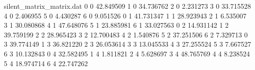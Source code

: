 
\begin{filecontents*}[overwrite]{silent_matrix_matrix.dat}
0 0 42.849509
1 0 34.736762
2 0 2.231273
3 0 33.715528
4 0 2.406955
5 0 4.430287
6 0 9.051526
0 1 41.731347
1 1 28.923943
2 1 6.535007
3 1 30.080868
4 1 47.648076
5 1 23.885981
6 1 33.027563
0 2 14.931142
1 2 39.759199
2 2 28.965423
3 2 12.700483
4 2 1.540876
5 2 37.251506
6 2 7.329713
0 3 39.774149
1 3 36.821220
2 3 26.053614
3 3 13.045533
4 3 27.255524
5 3 7.667527
6 3 10.132843
0 4 32.582495
1 4 1.811821
2 4 5.628697
3 4 48.765769
4 4 8.238524
5 4 18.974714
6 4 22.747262
\end{filecontents*}

